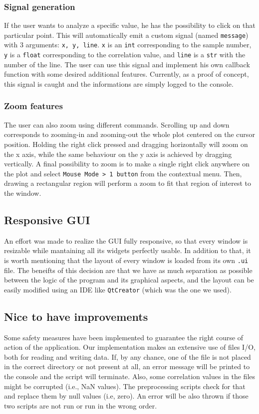 \documentclass[11pt,a4paper]{article}
\begin{document}
\subsubsection{Signal generation}
If the user wants to analyze a specific value, he has the possibility to click on that particular point. This will automatically emit a custom signal (named \texttt{message}) with 3 arguments: \texttt{x, y, line}. \texttt{x} is an \texttt{int} corresponding to the sample number, \texttt{y} is a \texttt{float} corresponding to the correlation value, and \texttt{line} is a \texttt{str} with the number of the line. The user can use this signal and implement his own callback function with some desired additional features. Currently, as a proof of concept, this signal is caught and the informations are simply logged to the console.

\subsubsection{Zoom features}
The user can also zoom using different commands. Scrolling up and down corresponds to zooming-in and zooming-out the whole plot centered on the cursor position. Holding the right click pressed and dragging horizontally will zoom on the x axis, while the same behaviour on the y axis is achieved by dragging vertically. A final possibility to zoom is to make a single right click anywhere on the plot and select \texttt{Mouse Mode > 1 button} from the contextual menu. Then, drawing a rectangular region will perform a zoom to fit that region of interest to the window.

\subsection{Responsive GUI}
An effort was made to realize the GUI fully responsive, so that every window is resizable while mantaining all its widgets perfectly usable. In addition to that, it is worth mentioning that the layout of every window is loaded from its own \texttt{.ui} file. The beneifts of this decision are that we have as much separation as possible between the logic of the program and its graphical aspects, and the layout can be easily modified using an IDE like \texttt{QtCreator} (which was the one we used).

\subsection{Nice to have improvements}
Some safety measures have been implemented to guarantee the right course of action of the application. Our implementation makes an extensive use of files I/O, both for reading and writing data. If, by any chance, one of the file is not placed in the correct directory or not present at all, an error message will be printed to the console and the script will terminate. Also, some correlation values in the files might be corrupted (i.e., NaN values). The preprocessing scripts check for that and replace them by null values (i.e, zero). An error will be also thrown if those two scripts are not run or run in the wrong order.
\end{document}
